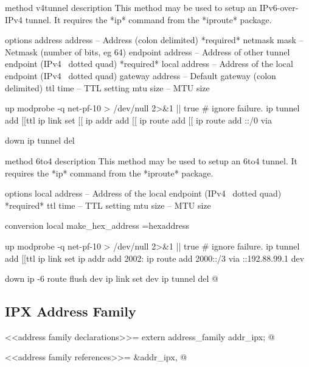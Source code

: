 \documentclass{article}
\begin{document}
method v4tunnel
  description
    This method may be used to setup an IPv6-over-IPv4 tunnel. It requires
    the *ip* command from the *iproute* package.

  options
    address address       -- Address (colon delimited) *required*
    netmask mask          -- Netmask (number of bits, eg 64) 
    endpoint address      -- Address of other tunnel endpoint (IPv4 \
                             dotted quad) *required*
    local address         -- Address of the local endpoint (IPv4 \
                             dotted quad)
    gateway address       -- Default gateway (colon delimited)
    ttl time              -- TTL setting
    mtu size              -- MTU size

  up
    modprobe -q net-pf-10 > /dev/null 2>&1 || true # ignore failure.
    ip tunnel add %
       [[ttl %
    ip link set %
    [[ ip addr add %
    [[ ip route add %
    [[ ip route add ::/0 via %

  down
    ip tunnel del %

method 6to4
  description
    This method may be used to setup an 6to4 tunnel. It requires
    the *ip* command from the *iproute* package.

  options
    local address         -- Address of the local endpoint (IPv4 \
                             dotted quad) *required*
    ttl time              -- TTL setting
    mtu size              -- MTU size

  conversion
    local make_hex_address =hexaddress

  up
    modprobe -q net-pf-10 > /dev/null 2>&1 || true # ignore failure.
    ip tunnel add %
       [[ttl %
    ip link set %
    ip addr add 2002:%
    ip route add 2000::/3 via ::192.88.99.1 dev %

  down
    ip -6 route flush dev %
    ip link set dev %
    ip tunnel del %
@ 

\subsection{IPX Address Family}

<<address family declarations>>=
extern address_family addr_ipx;
@ 

<<address family references>>=
&addr_ipx,
@ 
\end{document}
